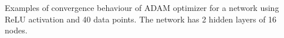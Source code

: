 \documentclass[11pt,t]{beamer}
\begin{document}
\begin{frame}
\centering
\footnotesize
{}
Examples of convergence behaviour of ADAM optimizer for a network using ReLU activation and 40 data points. The network has 2 hidden layers of 16 nodes.
\end{frame}
\end{document}
